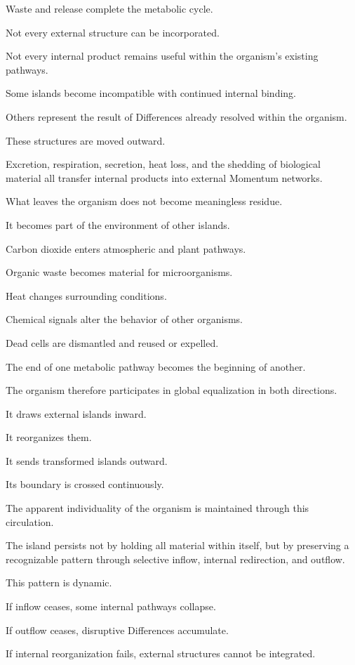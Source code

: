 Waste and release complete the metabolic cycle.

Not every external structure can be incorporated.

Not every internal product remains useful within the organism’s existing pathways.

Some islands become incompatible with continued internal binding.

Others represent the result of Differences already resolved within the organism.

These structures are moved outward.

Excretion, respiration, secretion, heat loss, and the shedding of biological material all transfer internal products into external Momentum networks.

What leaves the organism does not become meaningless residue.

It becomes part of the environment of other islands.

Carbon dioxide enters atmospheric and plant pathways.

Organic waste becomes material for microorganisms.

Heat changes surrounding conditions.

Chemical signals alter the behavior of other organisms.

Dead cells are dismantled and reused or expelled.

The end of one metabolic pathway becomes the beginning of another.

The organism therefore participates in global equalization in both directions.

It draws external islands inward.

It reorganizes them.

It sends transformed islands outward.

Its boundary is crossed continuously.

The apparent individuality of the organism is maintained through this circulation.

The island persists not by holding all material within itself, but by preserving a recognizable pattern through selective inflow, internal redirection, and outflow.

This pattern is dynamic.

If inflow ceases, some internal pathways collapse.

If outflow ceases, disruptive Differences accumulate.

If internal reorganization fails, external structures cannot be integrated.

